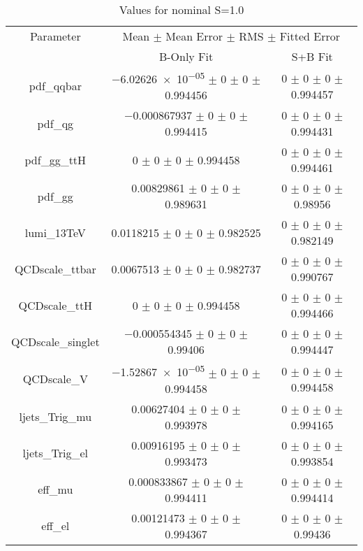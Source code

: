 \begin{table}
\centering
\caption{Values for nominal S=1.0}
\begin{tabular}{ccc}
\toprule
Parameter 	& \multicolumn{2}{c}{Mean $\pm$ Mean Error $\pm$ RMS $\pm$ Fitted Error}\\
 	& B-Only Fit & S+B Fit\\
\midrule
pdf\_qqbar 	& \num{-6.02626e-05} $\pm$ \num{0} $\pm$ \num{0} $\pm$ \num{0.994456} 	& \num{0} $\pm$ \num{0} $\pm$ \num{0} $\pm$ \num{0.994457}\\
pdf\_qg 	& \num{-0.000867937} $\pm$ \num{0} $\pm$ \num{0} $\pm$ \num{0.994415} 	& \num{0} $\pm$ \num{0} $\pm$ \num{0} $\pm$ \num{0.994431}\\
pdf\_gg\_ttH 	& \num{0} $\pm$ \num{0} $\pm$ \num{0} $\pm$ \num{0.994458} 	& \num{0} $\pm$ \num{0} $\pm$ \num{0} $\pm$ \num{0.994461}\\
pdf\_gg 	& \num{0.00829861} $\pm$ \num{0} $\pm$ \num{0} $\pm$ \num{0.989631} 	& \num{0} $\pm$ \num{0} $\pm$ \num{0} $\pm$ \num{0.98956}\\
lumi\_13TeV 	& \num{0.0118215} $\pm$ \num{0} $\pm$ \num{0} $\pm$ \num{0.982525} 	& \num{0} $\pm$ \num{0} $\pm$ \num{0} $\pm$ \num{0.982149}\\
QCDscale\_ttbar 	& \num{0.0067513} $\pm$ \num{0} $\pm$ \num{0} $\pm$ \num{0.982737} 	& \num{0} $\pm$ \num{0} $\pm$ \num{0} $\pm$ \num{0.990767}\\
QCDscale\_ttH 	& \num{0} $\pm$ \num{0} $\pm$ \num{0} $\pm$ \num{0.994458} 	& \num{0} $\pm$ \num{0} $\pm$ \num{0} $\pm$ \num{0.994466}\\
QCDscale\_singlet 	& \num{-0.000554345} $\pm$ \num{0} $\pm$ \num{0} $\pm$ \num{0.99406} 	& \num{0} $\pm$ \num{0} $\pm$ \num{0} $\pm$ \num{0.994447}\\
QCDscale\_V 	& \num{-1.52867e-05} $\pm$ \num{0} $\pm$ \num{0} $\pm$ \num{0.994458} 	& \num{0} $\pm$ \num{0} $\pm$ \num{0} $\pm$ \num{0.994458}\\
ljets\_Trig\_mu 	& \num{0.00627404} $\pm$ \num{0} $\pm$ \num{0} $\pm$ \num{0.993978} 	& \num{0} $\pm$ \num{0} $\pm$ \num{0} $\pm$ \num{0.994165}\\
ljets\_Trig\_el 	& \num{0.00916195} $\pm$ \num{0} $\pm$ \num{0} $\pm$ \num{0.993473} 	& \num{0} $\pm$ \num{0} $\pm$ \num{0} $\pm$ \num{0.993854}\\
eff\_mu 	& \num{0.000833867} $\pm$ \num{0} $\pm$ \num{0} $\pm$ \num{0.994411} 	& \num{0} $\pm$ \num{0} $\pm$ \num{0} $\pm$ \num{0.994414}\\
eff\_el 	& \num{0.00121473} $\pm$ \num{0} $\pm$ \num{0} $\pm$ \num{0.994367} 	& \num{0} $\pm$ \num{0} $\pm$ \num{0} $\pm$ \num{0.99436}\\

\end{tabular}
\end{table}
